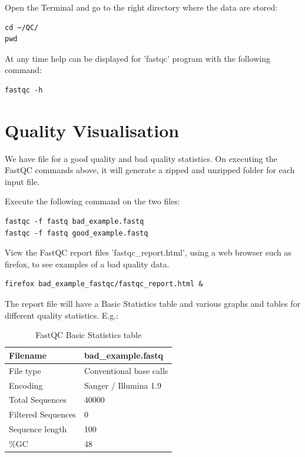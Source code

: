 \begin{steps}
Open the Terminal and go to the right directory where the data are stored:
\begin{lstlisting}
cd ~/QC/
pwd
\end{lstlisting}

At any time help can be displayed for 'fastqc' program with the following command:
\begin{lstlisting}
fastqc -h
\end{lstlisting}

\end{steps}


\section{Quality Visualisation}

\begin{information}
We have file for a good quality and bad quality statistics. On executing the
FastQC commands above, it will generate a zipped and unzipped folder for each
input file.
\end{information}

\begin{steps}
Execute the following command on the two files:
\begin{lstlisting}
fastqc -f fastq bad_example.fastq 
fastqc -f fastq good_example.fastq
\end{lstlisting}

View the FastQC report files 'fastqc\_report.html', using a web browser such as
firefox, to see examples of a bad quality data.

\begin{lstlisting}
firefox bad_example_fastqc/fastqc_report.html &
\end{lstlisting}

\end{steps}

\begin{note}
The report file will have a Basic Statistics table and various graphs and tables
for different quality statistics. E.g.:
\end{note}

\begin{table}[H]
  \centering
  \caption{FastQC Basic Statistics table}
    \begin{tabular}{ll}
    \toprule
    Filename & bad\_example.fastq \\
    \midrule
    File type & Conventional base calls \\
    Encoding & Sanger / Illumina 1.9 \\
    Total Sequences & 40000 \\
    Filtered Sequences & 0 \\
    Sequence length & 100 \\
    \%GC  & 48 \\
    \bottomrule
    \end{tabular}%
  \label{tab:badexampleuntrimmed}%
\end{table}%

